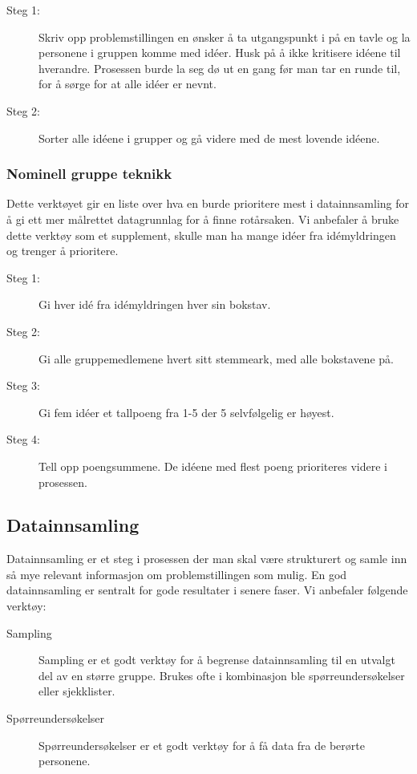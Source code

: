 \begin{description}
    \item[Steg 1:] Skriv opp problemstillingen en ønsker å ta utgangspunkt i på en tavle og la personene i gruppen komme med idéer. Husk på å ikke kritisere idéene til hverandre. Prosessen burde la seg dø ut en gang før man tar en runde til, for å sørge for at alle idéer er nevnt. 
    \item[Steg 2:] Sorter alle idéene i grupper og gå videre med de mest lovende idéene.
\end{description}

\subsubsection{Nominell gruppe teknikk} 
Dette verktøyet gir en liste over hva en burde prioritere mest i datainnsamling for å gi ett mer målrettet datagrunnlag for å finne rotårsaken. Vi anbefaler å bruke dette verktøy som et supplement, skulle man ha mange idéer fra idémyldringen og trenger å prioritere.
\begin{description}
    \item[Steg 1:] Gi hver idé fra idémyldringen hver sin bokstav.
    \item[Steg 2:] Gi alle gruppemedlemene hvert sitt stemmeark, med alle bokstavene på. 
    \item[Steg 3:] Gi fem idéer et tallpoeng fra 1-5 der 5 selvfølgelig er høyest.
    \item[Steg 4:] Tell opp poengsummene. De idéene med flest poeng prioriteres videre i prosessen.
\end{description}


\subsection{Datainnsamling}
Datainnsamling er et steg i prosessen der man skal være strukturert og samle inn så mye relevant informasjon om problemstillingen som mulig. En god datainnsamling er sentralt for gode resultater i senere faser. Vi anbefaler følgende verktøy:

\begin{description}
    \item[Sampling] Sampling er et godt verktøy for å begrense datainnsamling til en utvalgt del av en større gruppe. Brukes ofte i kombinasjon ble spørreundersøkelser eller sjekklister.
    \item[Spørreundersøkelser] Spørreundersøkelser er et godt verktøy for å få data fra de berørte personene.
\end{description}

